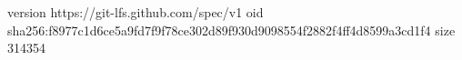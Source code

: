 version https://git-lfs.github.com/spec/v1
oid sha256:f8977c1d6ce5a9fd7f9f78ce302d89f930d9098554f2882f4ff4d8599a3cd1f4
size 314354
